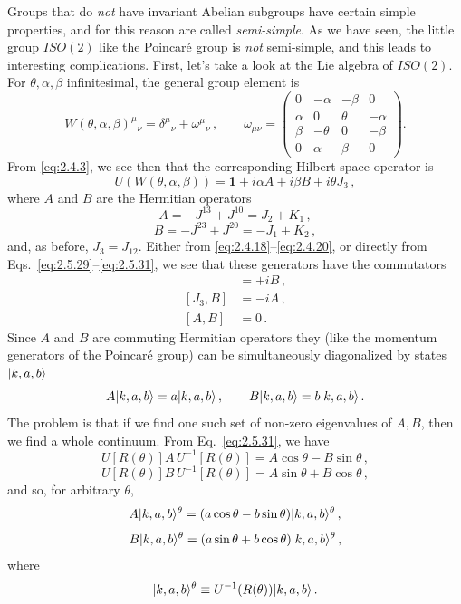 Groups that do \emph{not} have invariant Abelian subgroups have certain simple
properties, and for this reason are called \emph{semi-simple}. As we have seen,
the little group $ISO(2)$ like the Poincar\'e group is \emph{not}
semi-simple, and this leads to interesting complications. First, let's take a
look at the Lie algebra of $ISO(2)$. For $\theta,\alpha,\beta$ infinitesimal,
the general group element is
\[
W(\theta,\alpha,\beta)^\mu{}_{\nu}
=\delta^\mu{}_{\nu}+\omega^\mu{}_{\nu}\,,
\qquad
\omega_{\mu\nu}=
\begin{pmatrix}
0&-\alpha&-\beta&0\\
\alpha&0&\theta&-\alpha\\
\beta&-\theta&0&-\beta\\
0&\alpha&\beta&0
\end{pmatrix}.
\]
From \eqref{eq:2.4.3}, we see then that the corresponding Hilbert space operator is
\begin{equation}
U(W(\theta,\alpha,\beta))=\mathbf{1}+i\alpha A+i\beta B+i\theta J_3\,,
\tag{2.5.32}\label{eq:2.5.32}
\end{equation}
where $A$ and $B$ are the Hermitian operators
\begin{equation}
A=-J^{13}+J^{10}=J_2+K_1\,,
\tag{2.5.33}\label{eq:2.5.33}
\end{equation}
\begin{equation}
B=-J^{23}+J^{20}=-J_1+K_2\,,
\tag{2.5.34}\label{eq:2.5.34}
\end{equation}
and, as before, $J_3=J_{12}$. Either from \eqref{eq:2.4.18}--\eqref{eq:2.4.20}, or directly from
Eqs.~\eqref{eq:2.5.29}--\eqref{eq:2.5.31}, we see that these generators have the commutators
\begin{align}
[J_3,A]&=+iB\,, \tag{2.5.35}\label{eq:2.5.35}\\
[J_3,B]&=-iA\,, \tag{2.5.36}\label{eq:2.5.36}\\
[A,B]&=0\,. \tag{2.5.37}\label{eq:2.5.37}
\end{align}
Since $A$ and $B$ are commuting Hermitian operators they (like the momentum
generators of the Poincar\'e group) can be simultaneously
diagonalized by states $\lvert k,a,b\rangle$
\[
A\lvert k,a,b\rangle=a\lvert k,a,b\rangle\,,
\qquad
B\lvert k,a,b\rangle=b\lvert k,a,b\rangle\,.
\]
The problem is that if we find one such set of non-zero eigenvalues of $A,B$,
then we find a whole continuum. From Eq.~\eqref{eq:2.5.31}, we have
\[
U[R(\theta)]A\,U^{-1}[R(\theta)]=A\cos\theta-B\sin\theta\,,
\]
\[
U[R(\theta)]B\,U^{-1}[R(\theta)]=A\sin\theta+B\cos\theta\,,
\]
and so, for arbitrary $\theta$,
\[
A\lvert k,a,b\rangle^{\theta}=(a\cos\theta-b\sin\theta)\lvert k,a,b\rangle^{\theta}\,,
\]
\[
B\lvert k,a,b\rangle^{\theta}=(a\sin\theta+b\cos\theta)\lvert k,a,b\rangle^{\theta}\,,
\]
where
\[
\lvert k,a,b\rangle^{\theta}\equiv U^{-1}(R(\theta))\lvert k,a,b\rangle\,.
\]

